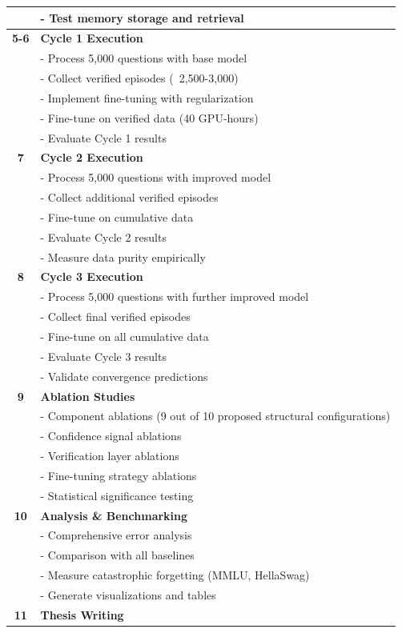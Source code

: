 \documentclass[12pt,a4paper]{article}
\theoremstyle{definition}
\begin{document}
\begin{table}[htbp]
\begin{tabular}{cp{9cm}}
& - Test memory storage and retrieval \\
\midrule
\textbf{5-6} & \textbf{Cycle 1 Execution} \\
& - Process 5,000 questions with base model \\
& - Collect verified episodes (~2,500-3,000) \\
& - Implement fine-tuning with regularization \\
& - Fine-tune on verified data (40 GPU-hours) \\
& - Evaluate Cycle 1 results \\
\midrule
\textbf{7} & \textbf{Cycle 2 Execution} \\
& - Process 5,000 questions with improved model \\
& - Collect additional verified episodes \\
& - Fine-tune on cumulative data \\
& - Evaluate Cycle 2 results \\
& - Measure data purity empirically \\
\midrule
\textbf{8} & \textbf{Cycle 3 Execution} \\
& - Process 5,000 questions with further improved model \\
& - Collect final verified episodes \\
& - Fine-tune on all cumulative data \\
& - Evaluate Cycle 3 results \\
& - Validate convergence predictions \\
\midrule
\textbf{9} & \textbf{Ablation Studies} \\
& - Component ablations (9 out of 10 proposed structural configurations) \\
& - Confidence signal ablations \\
& - Verification layer ablations \\
& - Fine-tuning strategy ablations \\
& - Statistical significance testing \\
\midrule
\textbf{10} & \textbf{Analysis \& Benchmarking} \\
& - Comprehensive error analysis \\
& - Comparison with all baselines \\
& - Measure catastrophic forgetting (MMLU, HellaSwag) \\
& - Generate visualizations and tables \\
\midrule
\textbf{11} & \textbf{Thesis Writing} \\

\end{tabular}
\end{table}
\end{document}
